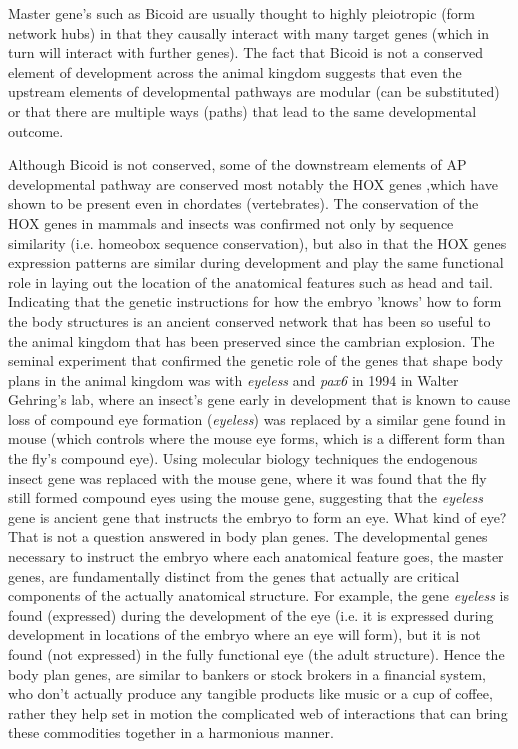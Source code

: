 Master gene's such as Bicoid are usually thought to highly pleiotropic (form network hubs) in that they causally interact with many target genes (which in turn will interact with further genes).  The fact that Bicoid is not a conserved element of development across the animal kingdom suggests that even the upstream elements of developmental pathways are modular (can be substituted) or that there are multiple ways (paths) that lead to the same developmental outcome.

Although Bicoid is not conserved, some of the downstream elements of AP developmental pathway are conserved most notably the HOX genes ,which have shown to be present even in chordates (vertebrates).  The conservation of the HOX genes in mammals and insects was confirmed not only by sequence similarity (i.e. homeobox sequence conservation), but also in that the HOX genes expression patterns are similar during development and play the same functional role in laying out the location of the anatomical features such as head and tail.  Indicating that the genetic instructions for how the embryo 'knows' how to form the body structures is an ancient conserved network that has been so useful to the animal kingdom that has been preserved since the cambrian explosion.  The seminal experiment that confirmed the genetic role of the genes that shape body plans in the animal kingdom was with \textit{eyeless} and \textit{pax6} in 1994 in Walter Gehring's lab, where an insect's gene early in development that is known to cause loss of compound eye formation (\textit{eyeless}) was replaced by a similar gene found in mouse (which controls where the mouse eye forms, which is a different form than the fly's compound eye).  Using molecular biology techniques the endogenous insect gene was replaced with the mouse gene, where it was found that the fly still formed compound eyes using the mouse gene, suggesting that the \textit{eyeless} gene is ancient gene that instructs the embryo to form an eye.  What kind of eye?  That is not a question answered in body plan genes.  The developmental genes necessary to instruct the embryo where each anatomical feature goes, the master genes, are fundamentally distinct from the genes that actually are critical components of the actually anatomical structure.  For example, the gene \textit{eyeless} is found (expressed) during the development of the eye (i.e. it is expressed during development in locations of the embryo where an eye will form), but it is not found (not expressed) in the fully functional eye (the adult structure).  Hence the body plan genes, are similar to bankers or stock brokers in a financial system, who don't actually produce any tangible products like music or a cup of coffee, rather they help set in motion the complicated web of interactions that can bring these commodities together in a harmonious manner. 

